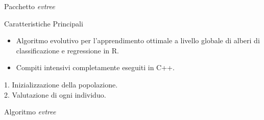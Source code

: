 \documentclass[9pt, xcolor=table]{beamer}
\begin{document}
	\begin{frame}{Pacchetto \textit{evtree}}
		\begin{block}{Caratteristiche Principali}
			\begin{itemize}
				\item Algoritmo evolutivo per l'apprendimento ottimale a livello globale di alberi di classificazione e regressione in R.
				\item Compiti intensivi completamente eseguiti in C++.
			\end{itemize}
		\end{block}
	
		\vfill
	
		\begin{algorithm}[H]
			1. Inizializzazione della popolazione.\\
			2. Valutazione di ogni individuo.\\
			\caption{Algoritmo \textit{evtree}}
		\end{algorithm}
	\end{frame}
\end{document}
